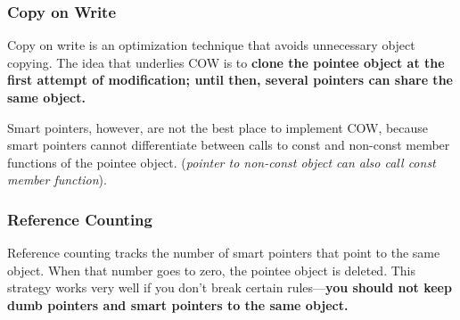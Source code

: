 \subsubsection{Copy on Write}
Copy on write is an optimization technique that avoids unnecessary
object copying. The idea that underlies COW is to \textbf{clone the pointee
object at the first attempt of modification; until then, several
pointers can share the same object.}

Smart pointers, however, are not the best place to implement COW,
because smart pointers cannot differentiate between calls to const and
non-const member functions of the pointee object. (\emph{pointer to
  non-const object can also call const member function}).

\subsubsection{Reference Counting}

Reference counting tracks the number of smart pointers that point to
the same object. When that number goes to zero, the pointee object is
deleted. This strategy works very well if you don't break certain
rules—\textbf{you should not keep dumb pointers and smart
  pointers to the same object.}

